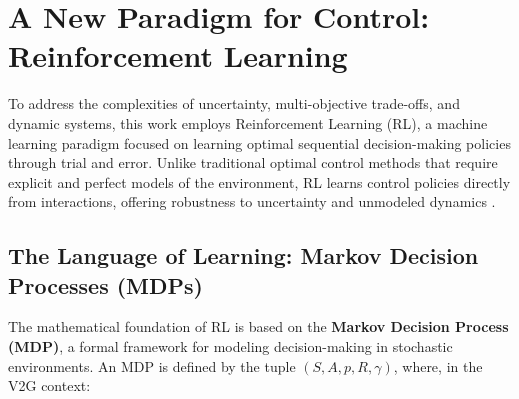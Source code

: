 \section{A New Paradigm for Control: Reinforcement Learning}

To address the complexities of uncertainty, multi-objective trade-offs, and dynamic systems, this work employs Reinforcement Learning (RL), a machine learning paradigm focused on learning optimal sequential decision-making policies through trial and error. Unlike traditional optimal control methods that require explicit and perfect models of the environment, RL learns control policies directly from interactions, offering robustness to uncertainty and unmodeled dynamics \cite{Xie2025, Qiu2023, Zhang2023}.

\subsection{The Language of Learning: Markov Decision Processes (MDPs)}

The mathematical foundation of RL is based on the \textbf{Markov Decision Process (MDP)}, a formal framework for modeling decision-making in stochastic environments. An MDP is defined by the tuple $(S, A, p, R, \gamma)$, where, in the V2G context:

